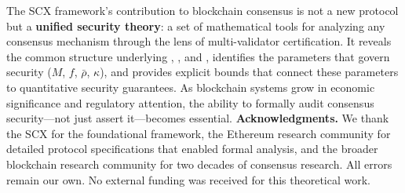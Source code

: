 \documentclass[11pt,a4paper]{article}
\theoremstyle{definition}
\newcommand{\SCX}{\textsc{SCX}}
\newcommand{\PoW}{\mathrm{PoW}}
\newcommand{\PoS}{\mathrm{PoS}}
\newcommand{\PBFT}{\mathrm{PBFT}}
\begin{document}
The \SCX{} framework's contribution to blockchain consensus is not a new protocol but a \textbf{unified security theory}: a set of mathematical tools for analyzing any consensus mechanism through the lens of multi-validator certification. It reveals the common structure underlying \PoW{}, \PoS{}, and \PBFT{}, identifies the parameters that govern security ($M$, $f$, $\bar{\rho}$, $\kappa$), and provides explicit bounds that connect these parameters to quantitative security guarantees. As blockchain systems grow in economic significance and regulatory attention, the ability to formally audit consensus security—not just assert it—becomes essential.
\medskip
\noindent\textbf{Acknowledgments.} We thank the SCX for the foundational framework, the Ethereum research community for detailed protocol specifications that enabled formal analysis, and the broader blockchain research community for two decades of consensus research. All errors remain our own. No external funding was received for this theoretical work.
\end{document}
